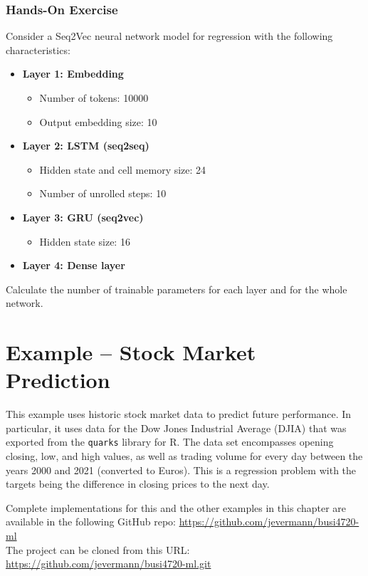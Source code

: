 \begin{tcolorbox}[colback=code]
\subsubsection*{Hands-On Exercise} 

Consider a Seq2Vec neural network model for regression with the following characteristics:

\begin{itemize}
   \item \textbf{Layer 1: Embedding}
   \begin{itemize}
      \item Number of tokens: 10000
      \item Output embedding size: 10
   \end{itemize}
   \item \textbf{Layer 2: LSTM (seq2seq)}
   \begin{itemize}
      \item Hidden state and cell memory size: 24
      \item Number of unrolled steps: 10
   \end{itemize}
   \item \textbf{Layer 3: GRU (seq2vec)}
   \begin{itemize}
      \item Hidden state size: 16
   \end{itemize}
   \item \textbf{Layer 4: Dense layer}
\end{itemize}

Calculate the number of trainable parameters for each layer and for the whole network.
\end{tcolorbox}

\section{Example -- Stock Market Prediction}

This example uses historic stock market data to predict future performance. In particular, it uses data for the Dow Jones Industrial Average (DJIA) that was exported from the \texttt{quarks} library for R. The data set encompasses opening closing, low, and high values, as well as trading volume for every day between the years 2000 and 2021 (converted to Euros). This is a regression problem with the targets being the difference in closing prices to the next day.

\begin{tcolorbox}[colback=code]
\footnotesize
Complete implementations for this and the other examples in this chapter are available in the following GitHub repo:
\url{https://github.com/jevermann/busi4720-ml} \\

The project can be cloned from this URL: \url{https://github.com/jevermann/busi4720-ml.git}
\normalsize
\end{tcolorbox}

